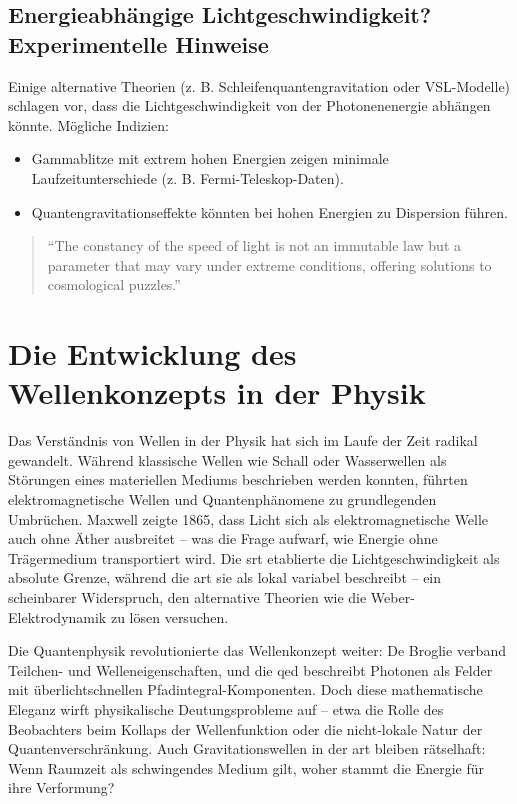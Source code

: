 \subsection{Energieabhängige Lichtgeschwindigkeit? Experimentelle Hinweise}
Einige alternative Theorien (z. B. Schleifenquantengravitation oder VSL-Modelle) schlagen vor, dass die Lichtgeschwindigkeit von der Photonenenergie abhängen könnte.
Mögliche Indizien:

\begin{itemize}
    \item Gammablitze mit extrem hohen Energien zeigen minimale Laufzeitunterschiede (z. B. Fermi-Teleskop-Daten).
    \item Quantengravitationseffekte könnten bei hohen Energien zu Dispersion führen.
\end{itemize}

\begin{quote}
    \enquote{The constancy of the speed of light is not an immutable law but a parameter that may vary under extreme conditions, offering solutions to cosmological puzzles.} \cite{Magueijo2003}
\end{quote}

\section{Die Entwicklung des Wellenkonzepts in der Physik}
Das Verständnis von Wellen in der Physik hat sich im Laufe der Zeit radikal gewandelt. Während klassische Wellen wie Schall oder Wasserwellen als Störungen eines materiellen Mediums
beschrieben werden konnten, führten elektromagnetische Wellen und Quantenphänomene zu grundlegenden Umbrüchen. Maxwell zeigte 1865, dass Licht sich als elektromagnetische Welle
auch ohne Äther ausbreitet – was die Frage aufwarf, wie Energie ohne Trägermedium transportiert wird. Die \gls{srt} etablierte die Lichtgeschwindigkeit
als absolute Grenze, während die \gls{art} sie als lokal variabel beschreibt – ein scheinbarer Widerspruch, den alternative Theorien wie die Weber-Elektrodynamik
zu lösen versuchen.

Die Quantenphysik revolutionierte das Wellenkonzept weiter: De Broglie verband Teilchen- und Welleneigenschaften, und die \gls{qed} beschreibt Photonen als Felder mit überlichtschnellen
Pfadintegral-Komponenten. Doch diese mathematische Eleganz wirft physikalische Deutungsprobleme auf – etwa die Rolle des Beobachters beim Kollaps der Wellenfunktion oder die nicht-lokale
Natur der Quantenverschränkung. Auch Gravitationswellen in der \gls{art} bleiben rätselhaft: Wenn Raumzeit als schwingendes Medium gilt, woher stammt die Energie für ihre Verformung?

